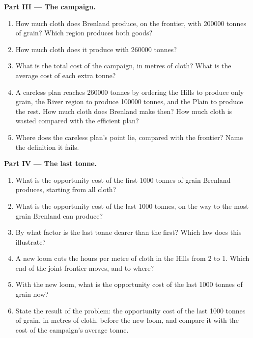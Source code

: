 \begin{problem}
\medskip
\noindent\textbf{Part III --- The campaign.}
\begin{enumerate}[resume]
\item How much cloth does Brenland produce, on the frontier, with \num{200000} tonnes of grain? Which
  region produces both goods?
\item How much cloth does it produce with \num{260000} tonnes?
\item What is the total cost of the campaign, in metres of cloth? What is the average cost of each extra
  tonne?
\item A careless plan reaches \num{260000} tonnes by ordering the Hills to produce only grain, the River
  region to produce \num{100000} tonnes, and the Plain to produce the rest. How much cloth does Brenland
  make then? How much cloth is wasted compared with the efficient plan?
\item Where does the careless plan's point lie, compared with the frontier? Name the definition it fails.
\end{enumerate}

\medskip
\noindent\textbf{Part IV --- The last tonne.}
\begin{enumerate}[resume]
\item What is the opportunity cost of the first \num{1000} tonnes of grain Brenland produces, starting from
  all cloth?
\item What is the opportunity cost of the last \num{1000} tonnes, on the way to the most grain Brenland
  can produce?
\item By what factor is the last tonne dearer than the first? Which law does this illustrate?
\item A new loom cuts the hours per metre of cloth in the Hills from 2 to 1. Which end of the joint
  frontier moves, and to where?
\item With the new loom, what is the opportunity cost of the last \num{1000} tonnes of grain now?
\item State the result of the problem: the opportunity cost of the last \num{1000} tonnes of grain, in
  metres of cloth, before the new loom, and compare it with the cost of the campaign's average tonne.
\end{enumerate}
\end{problem}
